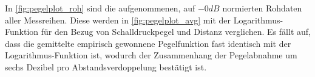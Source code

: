 In \autoref{fig:pegelplot_roh} sind die aufgenommenen, auf \(-0 dB\) normierten Rohdaten aller Messreihen. Diese werden in \autoref{fig:pegelplot_avg} mit der Logarithmus-Funktion für den Bezug von Schalldruckpegel und Distanz verglichen. Es fällt auf, dass die gemittelte empirisch gewonnene Pegelfunktion fast identisch mit der Logarithmus-Funktion ist, wodurch der Zusammenhang der Pegelabnahme um sechs Dezibel pro Abstandsverdoppelung bestätigt ist.

